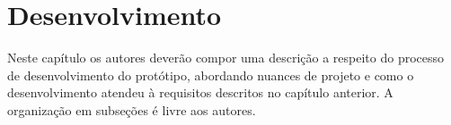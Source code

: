 \chapter{Desenvolvimento}
\label{cap:desenvolvimento}

Neste capítulo os autores deverão compor uma descrição a respeito do processo de desenvolvimento do protótipo, abordando nuances de projeto e como o desenvolvimento atendeu à requisitos descritos no capítulo anterior. A organização em subseções é livre aos autores.